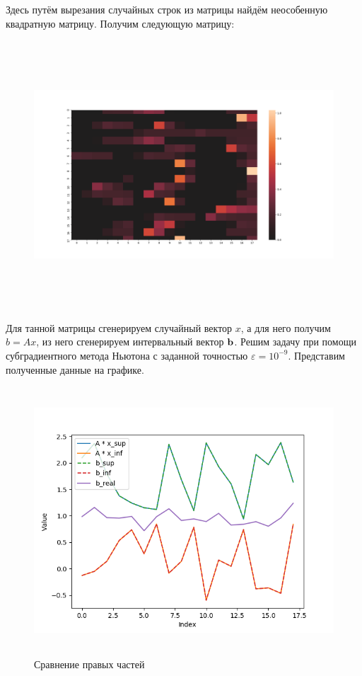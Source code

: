 \documentclass[12pt,a4paper]{scrartcl}
\begin{document}
Здесь путём вырезания случайных строк из матрицы найдём неособенную квадратную матрицу. Получим следующую матрицу:

\begin{figure}[H]
    \centering
    \includegraphics[width=14cm, height=10cm]{fig/nonspecial_1.png}
\end{figure}

Для танной матрицы сгенерируем случайный вектор $x$, а для него получим $b = Ax$, из него сгенерируем интервальный вектор $\bold b$. Решим задачу при помощи субградиентного метода Ньютона с заданной точностью $\varepsilon = 10^{-9}$. Представим полученные данные на графике.

\begin{figure}[H]
    \centering
    \includegraphics[width=14cm, height=10cm]{fig/b_comp_1.png}
	\caption{Сравнение правых частей}
\end{figure}
\end{document}
